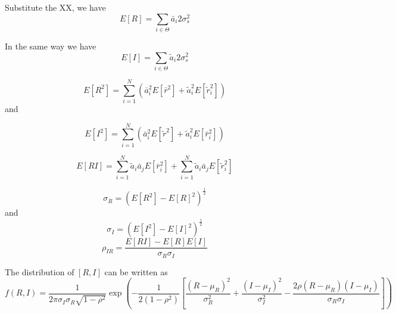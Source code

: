 Substitute the XX, we have 
\begin{equation}
  E[R] = \sum_{i\in\Theta}\bar{a}_i2\sigma_s^2
  \label{ER}
\end{equation}

In the same way we have
\begin{equation}
  E[I] = \sum_{i\in\Theta}\tilde{a}_i2\sigma_s^2
  \label{EI}
\end{equation}

\begin{equation}
  E[R^2] = \sum_{i=1}^N(\bar{a}_i^2E[\bar{r}^2] + \tilde{a}_i^2E[\tilde{r}_i^2])
  \label{ER2}
\end{equation}
 and 

\begin{equation}
  E[I^2] = \sum_{i=1}^N(\bar{a}_i^2E[\tilde{r}^2] + \tilde{a}_i^2E[\bar{r}_i^2])
  \label{EI2}
\end{equation}

\begin{equation}
  E[RI]=\sum_{i=1}^N\tilde{a}_i\bar{a}_jE[\bar{r}_i^2] + \sum_{i=1}^N\tilde{a}_i\bar{a}_jE[\tilde{r}_i^2] 
  \label{ERI}
\end{equation}

\begin{equation}
  \sigma_R = (E[R^2] - E[R]^2)^{\frac{1}{2}}
  \label{sigmaR}
\end{equation}
and 
\begin{equation}
  \sigma_I = (E[I^2] - E[I]^2)^{\frac{1}{2}}
  \label{sigmaI}
\end{equation}
\begin{equation}
  \rho_{IR} = \frac{E[RI] - E[R]E[I]}{\sigma_R\sigma_I}
  \label{phoRI}
\end{equation}

The distribution of $[R, I]$ can be written as
\begin{equation}
  f(R,I) = \frac{1}{2\pi\sigma_I\sigma_R\sqrt{1 - \rho^2}}\exp\left( -\frac{1}{2(1-\rho^2)}\left[ \frac{(R-\mu_R)^2}{\sigma_R^2} +  \frac{(I-\mu_I)^2}{\sigma_I^2} - \frac{2\rho(R-\mu_R)(I-\mu_I)}{\sigma_R\sigma_I}\right] \right)
  \label{disRI}
\end{equation}

